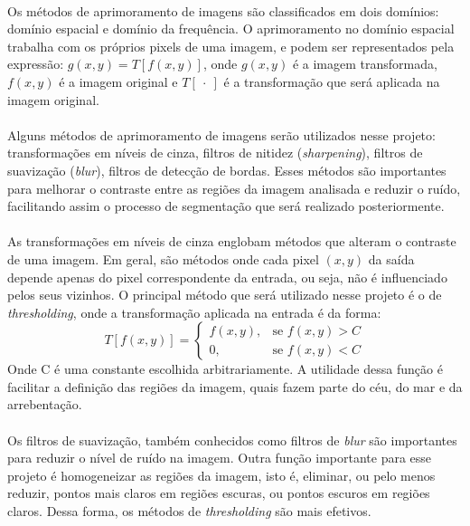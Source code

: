 \paragraph{}Os métodos de aprimoramento de imagens são classificados em dois domínios: domínio espacial e domínio da frequência. 
O aprimoramento no domínio espacial trabalha com os próprios pixels de uma imagem, e podem ser representados pela expressão: \(g(x,y) = T[f(x,y)]\), onde \( g(x,y) \) é a imagem transformada, \( f(x,y) \) é a imagem original e \( T[ \ \cdot\  ] \) é a transformação que será aplicada na imagem original.
\paragraph{}Alguns métodos de aprimoramento de imagens serão utilizados nesse projeto: transformações em níveis de cinza, filtros de nitidez (\textit{sharpening}), filtros de suavização (\textit{blur}), filtros de detecção de bordas. Esses métodos são importantes para melhorar o contraste entre as regiões da imagem analisada e reduzir o ruído, facilitando assim o processo de segmentação que será realizado posteriormente.
\paragraph{}As transformações em níveis de cinza englobam métodos que alteram o contraste de uma imagem. Em geral, são métodos onde cada pixel \((x,y)\) da saída depende apenas do pixel correspondente da entrada, ou seja, não é influenciado pelos seus vizinhos. O principal método que será utilizado nesse projeto é o de \textit{thresholding}, onde a transformação aplicada na entrada é da forma: 
\[
T[f(x,y)] =
\begin{cases}
        f(x,y), & \text{se } f(x,y) > C\\
        0, & \text{se } f(x,y) < C
\end{cases}
\] 
\noindent{}Onde C é uma constante escolhida arbitrariamente. A utilidade dessa função é facilitar a definição das regiões da imagem, quais fazem parte do céu, do mar e da arrebentação.
\paragraph{}Os filtros de suavização, também conhecidos como filtros de \textit{blur} são importantes para reduzir o nível de ruído na imagem. Outra função importante para esse projeto é homogeneizar as regiões da imagem, isto é, eliminar, ou pelo menos reduzir, pontos mais claros em regiões escuras, ou pontos escuros em regiões claros. Dessa forma, os métodos de \textit{thresholding} são mais efetivos.
